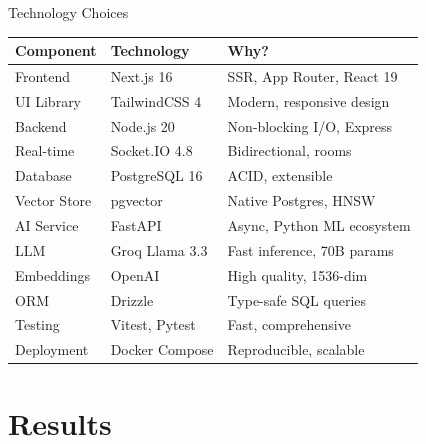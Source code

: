 \documentclass{beamer}
\begin{document}
\begin{frame}{Technology Choices}

\begin{table}[H]
\centering
\small
\begin{tabular}{|l|l|l|}
\hline
\textbf{Component} & \textbf{Technology} & \textbf{Why?} \\
\hline
Frontend & Next.js 16 & SSR, App Router, React 19 \\
UI Library & TailwindCSS 4 & Modern, responsive design \\
Backend & Node.js 20 & Non-blocking I/O, Express \\
Real-time & Socket.IO 4.8 & Bidirectional, rooms \\
Database & PostgreSQL 16 & ACID, extensible \\
Vector Store & pgvector & Native Postgres, HNSW \\
AI Service & FastAPI & Async, Python ML ecosystem \\
LLM & Groq Llama 3.3 & Fast inference, 70B params \\
Embeddings & OpenAI & High quality, 1536-dim \\
ORM & Drizzle & Type-safe SQL queries \\
Testing & Vitest, Pytest & Fast, comprehensive \\
Deployment & Docker Compose & Reproducible, scalable \\
\hline
\end{tabular}
\end{table}

\end{frame}


\section{Results}
\end{document}
